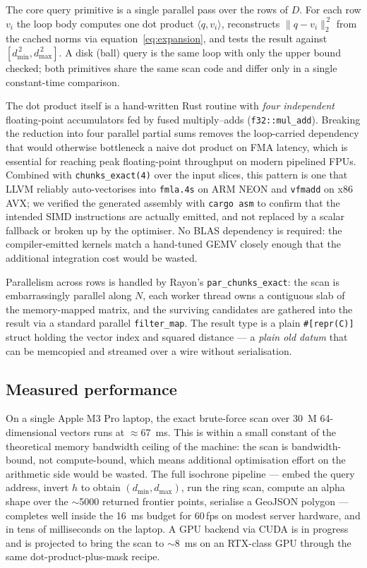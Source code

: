 \documentclass[11pt,a4paper]{article}
\begin{document}
The core query primitive is a single parallel pass over the rows of
$D$. For each row $v_{i}$ the loop body computes one dot product
$\langle q, v_{i} \rangle$, reconstructs $\|q - v_{i}\|_{2}^{\,2}$
from the cached norms via equation~\eqref{eq:expansion}, and tests
the result against $[d_{\min}^{\,2}, d_{\max}^{\,2}]$. A disk (ball)
query is the same loop with only the upper bound checked; both
primitives share the same scan code and differ only in a single
constant-time comparison.

The dot product itself is a hand-written Rust routine with
\emph{four independent} floating-point accumulators fed by fused
multiply--adds (\texttt{f32::mul\_add}). Breaking the reduction into
four parallel partial sums removes the loop-carried dependency that
would otherwise bottleneck a naive dot product on FMA latency, which
is essential for reaching peak floating-point throughput on modern
pipelined FPUs. Combined with \texttt{chunks\_exact(4)} over the
input slices, this pattern is one that LLVM reliably auto-vectorises
into \texttt{fmla.4s} on ARM NEON and \texttt{vfmadd} on x86 AVX;
we verified the generated assembly with \texttt{cargo asm} to
confirm that the intended SIMD instructions are actually emitted,
and not replaced by a scalar fallback or broken up by the optimiser.
No BLAS dependency is required: the compiler-emitted kernels match
a hand-tuned GEMV closely enough that the additional integration
cost would be wasted.

Parallelism across rows is handled by Rayon's
\texttt{par\_chunks\_exact}: the scan is embarrassingly parallel
along $N$, each worker thread owns a contiguous slab of the
memory-mapped matrix, and the surviving candidates are gathered
into the result via a standard parallel \texttt{filter\_map}. The
result type is a plain \texttt{\#[repr(C)]} struct holding the
vector index and squared distance --- a \emph{plain old datum} that
can be memcopied and streamed over a wire without serialisation.

\subsection{Measured performance}
On a single Apple M3 Pro laptop, the exact brute-force scan over
30~M 64-dimensional vectors runs at $\approx$67~ms. This is within
a small constant of the theoretical memory bandwidth ceiling of the
machine: the scan is bandwidth-bound, not compute-bound, which
means additional optimisation effort on the arithmetic side would
be wasted. The full isochrone pipeline --- embed the query address,
invert $h$ to obtain $(d_\text{min}, d_\text{max})$, run the ring
scan, compute an alpha shape over the $\sim$5000 returned frontier
points, serialise a GeoJSON polygon --- completes well inside the
16~ms budget for 60\,fps on modest server hardware, and in tens of
milliseconds on the laptop. A GPU backend via CUDA is in progress
and is projected to bring the scan to $\sim$8~ms on an RTX-class
GPU through the same dot-product-plus-mask recipe.
\end{document}
